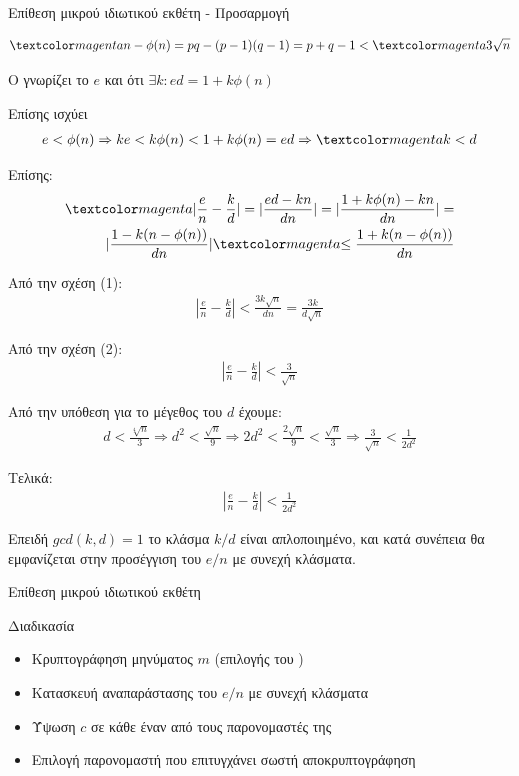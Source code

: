 \documentclass[handout]{beamer}
\begin{document}
\begin{frame}[allowframebreaks]{Επίθεση μικρού ιδιωτικού εκθέτη - Προσαρμογή} 

\begin{align}
\magenta{n-\phi(n)} = pq - (p-1)(q-1) = p + q -1 < \magenta{3\sqrt{n}}
\end{align}

O \adv γνωρίζει το $e$ και ότι $\exists k: ed  = 1 + k\phi(n)$ 

Επίσης ισχύει 
\begin{align}
e<\phi(n) \Rightarrow  ke < k\phi(n)<1+k\phi(n)=ed \Rightarrow \magenta{k < d}
\end{align}

Επίσης:
\begin{align*}
\magenta{|\frac{e}{n} - \frac{k}{d}|} =   |\frac{ed-kn}{dn}| =  |\frac{1+k\phi(n)-kn}{dn}| = \\ |\frac{1-k(n-\phi(n))}{dn}| \magenta{\leq \frac{1+k(n-\phi(n))}{dn}}
\end{align*}

Από την σχέση (1):
\begin{align*}
|\frac{e}{n} - \frac{k}{d}| < \frac{3k\sqrt{n}}{dn} = \frac{3k}{d\sqrt{n}}
\end{align*}

Από την σχέση (2):
\begin{align*}
|\frac{e}{n} - \frac{k}{d}| <   \frac{3}{\sqrt{n}}
\end{align*}

Από την υπόθεση για το μέγεθος του $d$ έχουμε: 
\begin{align*}
d < \frac{\sqrt[4]{n}}{3} \Rightarrow d^2 < \frac{\sqrt{n}}{9}  \Rightarrow 2d^2 < \frac{2\sqrt{n}}{9} < \frac{\sqrt{n}}{3} \Rightarrow \frac{3}{\sqrt{n}} < \frac{1}{2d^2}
\end{align*}

Τελικά:
\begin{align*}
|\frac{e}{n} - \frac{k}{d}| < \frac{1}{2d^2}
\end{align*}

Επειδή $gcd(k,d)=1$ το κλάσμα $k/d$ είναι απλοποιημένο, και κατά συνέπεια θα εμφανίζεται στην προσέγγιση του $e/n$ με συνεχή κλάσματα.
\end{frame}

\begin{frame}{Επίθεση μικρού ιδιωτικού εκθέτη}
\begin{block}{Διαδικασία}
\begin{itemize}
\item Κρυπτογράφηση μηνύματος $m$ (επιλογής του \adv)
\pause
\item Κατασκευή αναπαράστασης του $e/n$ με συνεχή κλάσματα 
\pause
\item Ύψωση $c$ σε κάθε έναν από τους παρονομαστές της
\pause
\item Επιλογή παρονομαστή που επιτυγχάνει σωστή αποκρυπτογράφηση 
\end{itemize}
\end{block}
\end{frame}
\end{document}
